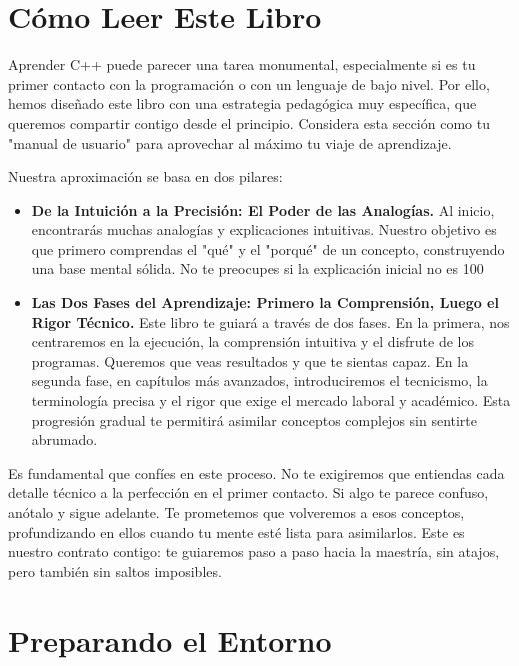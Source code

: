 \section{Cómo Leer Este Libro}
\label{sec:como_leer}

Aprender C++ puede parecer una tarea monumental, especialmente si es tu primer contacto con la programación o con un lenguaje de bajo nivel. Por ello, hemos diseñado este libro con una estrategia pedagógica muy específica, que queremos compartir contigo desde el principio. Considera esta sección como tu "manual de usuario" para aprovechar al máximo tu viaje de aprendizaje.

Nuestra aproximación se basa en dos pilares:
\begin{itemize}
    \item \textbf{De la Intuición a la Precisión: El Poder de las Analogías.} Al inicio, encontrarás muchas analogías y explicaciones intuitivas. Nuestro objetivo es que primero comprendas el "qué" y el "porqué" de un concepto, construyendo una base mental sólida. No te preocupes si la explicación inicial no es 100%
    \item \textbf{Las Dos Fases del Aprendizaje: Primero la Comprensión, Luego el Rigor Técnico.} Este libro te guiará a través de dos fases. En la primera, nos centraremos en la ejecución, la comprensión intuitiva y el disfrute de los programas. Queremos que veas resultados y que te sientas capaz. En la segunda fase, en capítulos más avanzados, introduciremos el tecnicismo, la terminología precisa y el rigor que exige el mercado laboral y académico. Esta progresión gradual te permitirá asimilar conceptos complejos sin sentirte abrumado.
\end{itemize}

Es fundamental que confíes en este proceso. No te exigiremos que entiendas cada detalle técnico a la perfección en el primer contacto. Si algo te parece confuso, anótalo y sigue adelante. Te prometemos que volveremos a esos conceptos, profundizando en ellos cuando tu mente esté lista para asimilarlos. Este es nuestro contrato contigo: te guiaremos paso a paso hacia la maestría, sin atajos, pero también sin saltos imposibles.

\section{Preparando el Entorno}
\label{sec:entorno}

